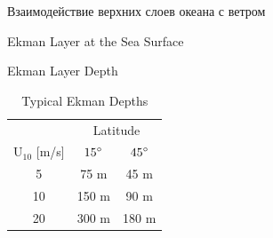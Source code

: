 \begin{chapter}{Взаимодействие верхних слоев океана с ветром}
\begin{section}{Ekman Layer at the Sea Surface}
\begin{paragraph}{Ekman Layer Depth}
\begin{table}[h!]
\caption{Typical Ekman Depths}
\begin{centering}
\begin{tabular}{c|cc}
\hline
               &\multicolumn{2}{c}{Latitude}      \\
U$_{10}$ [m/s]  & ${15}^\circ$      & ${45}^\circ$ \\
\hline
5              & 75  m & 45 m       \\
10             & 150 m & 90 m       \\
20             & 300 m & 180 m      \\
\hline
\end{tabular}
\end{centering}
\end{table}
%
\end{paragraph}


\end{section}
\end{chapter}
